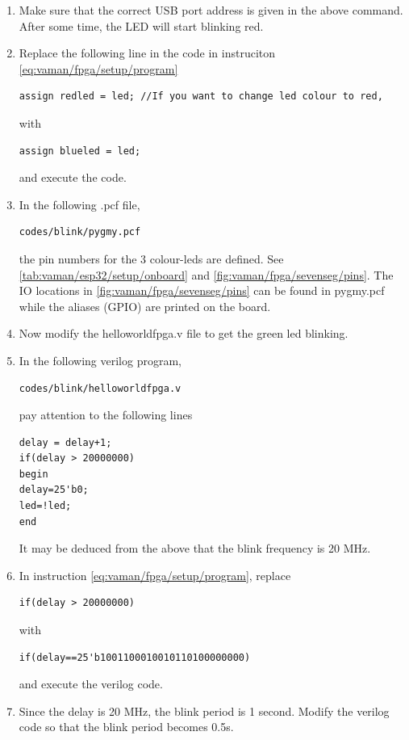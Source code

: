 \begin{enumerate}[label=\arabic*.,ref=\theenumi]
\begin{lstlisting}
\end{lstlisting}
\item Make sure that the correct USB port address is given in the above command.    After some time, the LED will start blinking red.
\item Replace  the following line in the code in instruciton  \ref{eq:vaman/fpga/setup/program} 
\begin{lstlisting}
assign redled = led; //If you want to change led colour to red,
\end{lstlisting}
with
\begin{lstlisting}
assign blueled = led; 
\end{lstlisting}
and execute the code.
\item In the following .pcf file,
\begin{lstlisting}
codes/blink/pygmy.pcf
\end{lstlisting}
the pin numbers for the 3 colour-leds are defined.  See 
\autoref{tab:vaman/esp32/setup/onboard}
and
\autoref{fig:vaman/fpga/sevenseg/pins}.  The IO locations in 
		\autoref{fig:vaman/fpga/sevenseg/pins} can be found in pygmy.pcf while the aliases (GPIO) are printed on the board.
\item Now modify the helloworldfpga.v  file to get the green led blinking.
\item In the following verilog program, 
\label{eq:vaman/fpga/setup/program}
\begin{lstlisting}
codes/blink/helloworldfpga.v
\end{lstlisting}
pay attention to the following lines
\begin{lstlisting}
delay = delay+1;                                                                                                   
if(delay > 20000000)
begin
delay=25'b0;
led=!led;
end
\end{lstlisting}
It may be deduced from the above that the blink frequency is 20 MHz.
\item In instruction  \ref{eq:vaman/fpga/setup/program}, replace
\label{eq:vaman/fpga/setup/binary}
\begin{lstlisting}
if(delay > 20000000)
\end{lstlisting}
%
with
\begin{lstlisting}
if(delay==25'b1001100010010110100000000)
\end{lstlisting}
and execute the verilog code.
\item Since the delay is 20 MHz, the blink period is 1 second.  Modify the verilog code
so that the blink period becomes 0.5s.

\end{enumerate}
